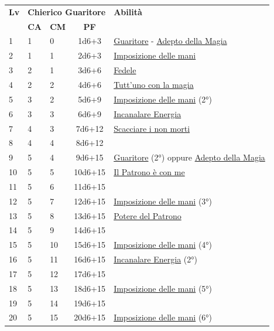 {\begin{multicols}{2}

\noindent\begin{tabularx}{\linewidth}{p{0.3cm}|p{0.3cm}p{0.3cm}c|X|}
	\toprule
 \rowcolor{gray!20}	\textbf{Lv} & \multicolumn{3}{c|}{\textbf{Chierico Guaritore}} & \textbf{Abilità} \\
& \centering\arraybackslash \textbf{CA} & \centering\arraybackslash \textbf{CM} & \centering\arraybackslash \textbf{PF} & \\
	\toprule
	1 &1	& 0	&	1d6+3	&\hyperlink{Guaritore}{Guaritore} - \hyperlink{Adepto della Magia}{Adepto della Magia}\\
 \rowcolor{gray!20}2	&	1	& 1	&	2d6+3	&\hyperlink{Imposizione delle mani}{Imposizione delle mani}\\
	3	&	2	& 1	&	3d6+6	&\hyperlink{Fedele}{Fedele}\\
 \rowcolor{gray!20}4	&	2	& 2	&	4d6+6	&\hyperlink{Tutt'uno con la magia}{Tutt'uno con la magia}\\
	5	&	3	& 2	&	5d6+9	&\hyperlink{Imposizione delle mani}{Imposizione delle mani} (2°)\\
 \rowcolor{gray!20}6	&	3	& 3	&	6d6+9	&\hyperlink{Incanalare Energia}{Incanalare Energia}\\
	7	&	4	& 3	&	7d6+12	&\hyperlink{Scacciare i non morti}{Scacciare i non morti}\\
 \rowcolor{gray!20}8	&	4	& 4	&	8d6+12	&\\
	9	&	5	& 4	&	9d6+15	&\hyperlink{Guaritore}{Guaritore} (2°) oppure \hyperlink{Adepto della Magia}{Adepto della Magia}\\
 \rowcolor{gray!20}10	&	5	& 5	&	10d6+15	&\hyperlink{Il Patrono è con me}{Il Patrono è con me}\\
	11	&	5	& 6	&	11d6+15	&\\
 \rowcolor{gray!20}12	&	5	& 7	&	12d6+15	&\hyperlink{Imposizione delle mani}{Imposizione delle mani} (3°)\\
	13	&	5	& 8	&	13d6+15	&\hyperlink{Potere del Patrono}{Potere del Patrono}\\
 \rowcolor{gray!20}14	&	5	& 9	&	14d6+15	&\\
	15	&	5	& 10	&	15d6+15	&\hyperlink{Imposizione delle mani}{Imposizione delle mani} (4°)\\
 \rowcolor{gray!20}16	&	5	& 11	&	16d6+15	&\hyperlink{Incanalare Energia}{Incanalare Energia} (2°)\\
	17	&	5	& 12	&	17d6+15	&\\
 \rowcolor{gray!20}18	&	5	& 13	&	18d6+15	&\hyperlink{Imposizione delle mani}{Imposizione delle mani} (5°)\\
	19	&	5	& 14	&	19d6+15	&\\
 \rowcolor{gray!20}20	&	5	& 15	&	20d6+15	&\hyperlink{Imposizione delle mani}{Imposizione delle mani} (6°)\\
\end{tabularx}


\end{multicols}}
